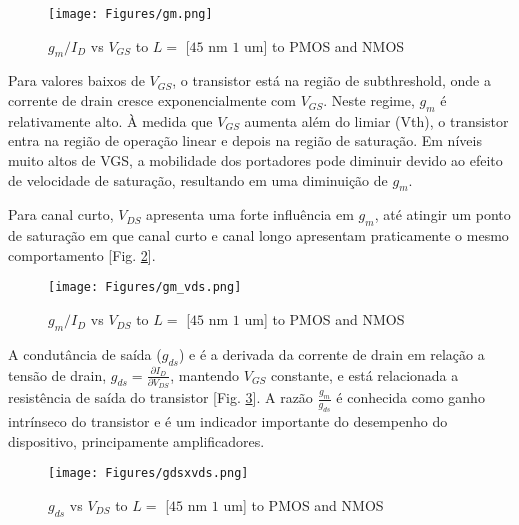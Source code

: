 \documentclass[10pt, conference,a4paper]{IEEEtran}
\begin{document}

\begin{figure}[h]
    \centering
    \texttt{[image: Figures/gm.png]}
    \caption{$g_m/I_D$ vs $V_{GS}$ to $L =$ [$45$ nm $1$ um] to PMOS and NMOS}
    \label{fig:gm}
\end{figure}


Para valores baixos de $V_{GS}$, o transistor está na região de subthreshold, onde a corrente de drain cresce exponencialmente com $V_{GS}$. Neste regime, $g_m$ é relativamente alto. À medida que $V_{GS}$ aumenta além do limiar (Vth), o transistor entra na região de operação linear e depois na região de saturação. Em níveis muito altos de VGS, a mobilidade dos portadores pode diminuir devido ao efeito de velocidade de saturação, resultando em uma diminuição de $g_m$.


Para canal curto, $V_{DS}$ apresenta uma forte influência em $g_m$, até atingir um ponto de saturação em que canal curto e canal longo apresentam praticamente o mesmo comportamento [Fig. \ref{fig:gm_vds}].

\begin{figure}[h]
    \centering
    \texttt{[image: Figures/gm\_vds.png]}
    \caption{$g_m/I_D$ vs $V_{DS}$ to $L =$ [$45$ nm $1$ um] to PMOS and NMOS}
    \label{fig:gm_vds}
\end{figure}

A condutância de saída ($g_{ds}$) e é a derivada da corrente de drain em relação a tensão de drain, $g_{ds} = \frac{\partial I_D}{\partial V_{DS}}$, mantendo $V_{GS}$ constante, e está relacionada a resistência de saída do transistor [Fig. \ref{fig:gdsxvds}]. A razão $\frac{g_m}{g_{ds}}$ é conhecida como ganho intrínseco do transistor e é um indicador importante do desempenho do dispositivo, principamente amplificadores.

\begin{figure}[h]
    \centering
    \texttt{[image: Figures/gdsxvds.png]}
    \caption{$g_{ds}$ vs $V_{DS}$ to $L =$ [$45$ nm $1$ um] to PMOS and NMOS}
    \label{fig:gdsxvds}
\end{figure}
\end{document}
